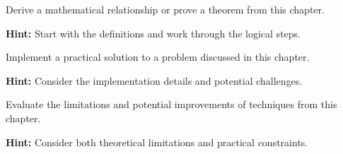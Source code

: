\begin{problem}
Derive a mathematical relationship or prove a theorem from this chapter.

\textbf{Hint:} Start with the definitions and work through the logical steps.
\end{problem}

\begin{problem}
Implement a practical solution to a problem discussed in this chapter.

\textbf{Hint:} Consider the implementation details and potential challenges.
\end{problem}

\begin{problem}
Evaluate the limitations and potential improvements of techniques from this chapter.

\textbf{Hint:} Consider both theoretical limitations and practical constraints.
\end{problem}
